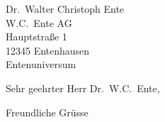 \documentclass
[
fhnw
]
{scrlttr2}
\begin{document}
\begin{letter}
	{Dr.~Walter Christoph Ente\\
	W.C.~Ente AG\\
	Hauptstra\ss{}e 1\\
	12345 Entenhausen\\
	Entenuniversum%
	}
	\opening{Sehr geehrter Herr Dr.~W.C.~Ente,}
	\lipsum[36]
	\lipsum[10]
	\closing{Freundliche Gr\"usse}
\end{letter}
\end{document}
